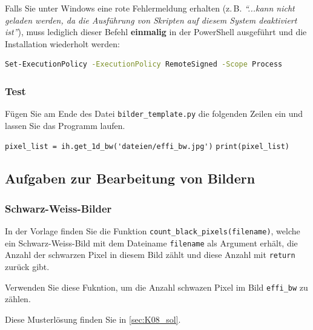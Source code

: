 \vspace{1.5em}

\begin{tcolorbox}[title=\textbf{⚠️ Windows-Fehlerbehebung (Skript-Ausführungsfehler)}, fonttitle=\bfseries]
	Falls Sie unter Windows eine rote Fehlermeldung erhalten (z.\,B. \textit{``...kann nicht geladen werden, da die Ausführung von Skripten auf diesem System deaktiviert ist''}), muss lediglich dieser Befehl \textbf{einmalig} in der PowerShell ausgeführt und die Installation wiederholt werden:
	\begin{lstlisting}[language=bash, backgroundcolor=\color{white}, frame=none]
Set-ExecutionPolicy -ExecutionPolicy RemoteSigned -Scope Process
\end{lstlisting}
\end{tcolorbox}

\subsubsection*{Test}
Fügen Sie am Ende des Datei \texttt{bilder\_template.py} die folgenden Zeilen ein und lassen Sie das Programm laufen.

\lstinline|pixel_list = ih.get_1d_bw('dateien/effi_bw.jpg')| \newline
\lstinline|print(pixel_list)|




\subsection{Aufgaben zur Bearbeitung von Bildern}
\subsubsection{Schwarz-Weiss-Bilder}
\begin{myexercise}
	In der Vorlage finden Sie die Funktion \lstinline|count_black_pixels(filename)|, welche ein Schwarz-Weiss-Bild mit dem Dateiname \lstinline|filename| als Argument erhält, die Anzahl der schwarzen Pixel in diesem Bild zählt und diese Anzahl mit \lstinline|return| zurück gibt.

	Verwenden Sie diese Fukntion, um die Anzahl schwazen Pixel im Bild \texttt{effi\_bw} zu zählen.
	\begin{myanswer}
		Diese Musterlösung finden Sie in \cref{sec:K08_sol}.
	\end{myanswer}
\end{myexercise}

